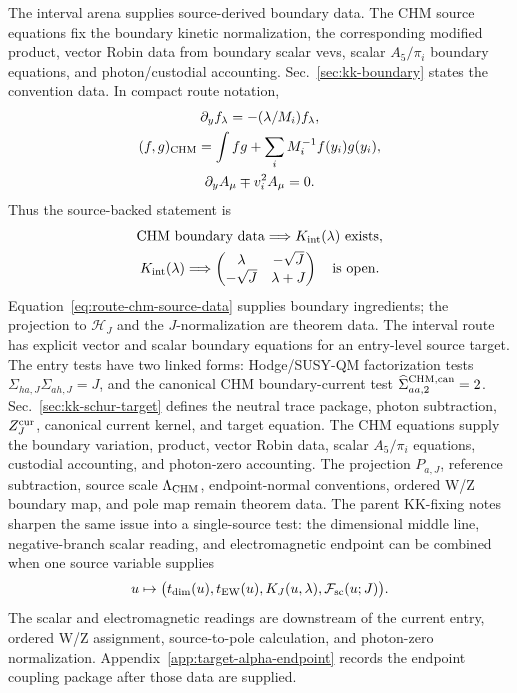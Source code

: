 The interval arena supplies source-derived boundary data.  The CHM source
equations fix the boundary kinetic normalization, the corresponding modified
product, vector Robin data from boundary scalar vevs, scalar \(A_5/\pi_i\)
boundary equations, and photon/custodial accounting.  Sec.~\ref{sec:kk-boundary}
states the convention data.  In compact route notation,
\begin{equation}
  \begin{gathered}
  \partial_y f_\lambda=-(\lambda/M_i)f_\lambda,\\
  (f,g)_{\rm CHM}=\int fg+\sum_i M_i^{-1}f(y_i)g(y_i),\\
  \partial_y A_\mu\mp v_i^2A_\mu=0.
  \end{gathered}
  \label{eq:route-chm-source-data}
\end{equation}
Thus the source-backed statement is
\begin{equation}
  \begin{gathered}
  \hbox{CHM boundary data}
  \Longrightarrow
  K_{\rm int}(\lambda)\ \hbox{exists},\\
  K_{\rm int}(\lambda)
  \Longrightarrow
  \begin{pmatrix}
  \lambda&-\sqrt J\\
  -\sqrt J&\lambda+J
  \end{pmatrix}
  \quad\hbox{is open}.
  \end{gathered}
  \label{eq:route-chm-open-target}
\end{equation}
Equation~\eqref{eq:route-chm-source-data} supplies boundary ingredients; the
projection to \(\mathcal H_J\) and the \(J\)-normalization are theorem data.
The interval route has explicit vector and scalar boundary equations for an
entry-level source target.  The entry tests have two linked forms:
Hodge/SUSY-QM factorization tests
\(\Sigma_{ha,J}\Sigma_{ah,J}=J\), and the canonical CHM boundary-current test
\(\widehat\Sigma_{aa,2}^{\rm CHM,can}=2\).  Sec.~\ref{sec:kk-schur-target}
defines the neutral trace package, photon subtraction, \(Z_J^{\rm cur}\),
canonical current kernel, and target equation.  The CHM equations supply the
boundary variation, product, vector Robin data, scalar \(A_5/\pi_i\) equations,
custodial accounting, and photon-zero accounting.  The projection
\(P_{a,J}\), reference subtraction, source scale \(\Lambda_{\rm CHM}\),
endpoint-normal conventions, ordered W/Z boundary map, and pole map remain
theorem data.  The parent KK-fixing notes sharpen the same issue into a single-source
test: the dimensional middle line, negative-branch scalar reading, and
electromagnetic endpoint can be combined when one source variable
supplies
\begin{equation}
  u\mapsto
  \big(t_{\rm dim}(u),t_{\rm EW}(u),
  K_J(u,\lambda),\mathcal F_{\rm sc}(u;J)\big).
  \label{eq:route-single-source-chm-test}
\end{equation}
The scalar and electromagnetic readings are downstream of the current entry,
ordered W/Z assignment, source-to-pole calculation, and photon-zero
normalization.  Appendix~\ref{app:target-alpha-endpoint} records the endpoint
coupling package after those data are supplied.

